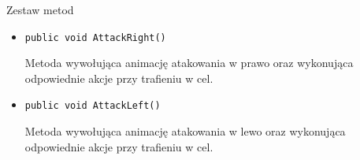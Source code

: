 \documentclass[12pt, a4paper]{article}
\begin{document}
\begin{enumerate}
Zestaw metod%

\begin{itemize}
\item \texttt{public void AttackRight()}

Metoda wywołująca animację atakowania w prawo oraz wykonująca odpowiednie 
akcje przy trafieniu w cel.

\item \texttt{public void AttackLeft()}

Metoda wywołująca animację atakowania w lewo oraz wykonująca odpowiednie 
akcje przy trafieniu w cel.

\end{itemize}

\end{enumerate}
\end{document}
